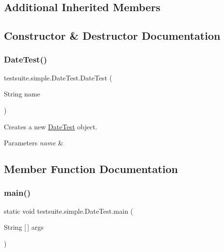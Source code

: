 \subsection*{Additional Inherited Members}


\subsection{Constructor \& Destructor Documentation}
\mbox{\label{classtestsuite_1_1simple_1_1_date_test_a60a505c566e773c02bbbb3110db9f086}} 
\subsubsection{\texorpdfstring{Date\+Test()}{DateTest()}}
{\footnotesize\ttfamily testsuite.\+simple.\+Date\+Test.\+Date\+Test (\begin{DoxyParamCaption}\item[{String}]{name }\end{DoxyParamCaption})}

Creates a new \mbox{\hyperlink{classtestsuite_1_1simple_1_1_date_test}{Date\+Test}} object.


\begin{DoxyParams}{Parameters}
{\em name} & \\
\hline
\end{DoxyParams}


\subsection{Member Function Documentation}
\mbox{\label{classtestsuite_1_1simple_1_1_date_test_a1d2bf67257401c0087fbe82d7e7ef0ff}} 
\subsubsection{\texorpdfstring{main()}{main()}}
{\footnotesize\ttfamily static void testsuite.\+simple.\+Date\+Test.\+main (\begin{DoxyParamCaption}\item[{String \mbox{[}$\,$\mbox{]}}]{args }\end{DoxyParamCaption})\hspace{0.3cm}{\ttfamily [static]}}

